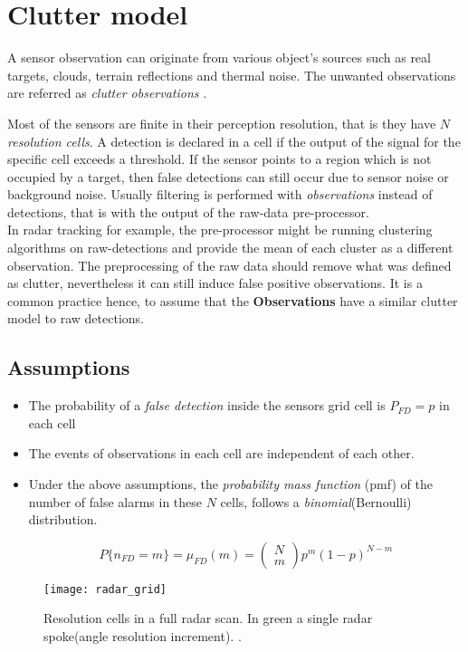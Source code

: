 \section{Clutter model}
A sensor observation can originate from various object's sources such as real targets, clouds, terrain reflections and thermal noise. The unwanted observations are referred as \emph{clutter observations} \cite{Memon2020}.


Most of the sensors are finite in their perception resolution, that is they have $N$  \emph{resolution cells}. A detection is declared in a cell if  the output of the signal for the specific cell exceeds a threshold. If the sensor points to a region which is not occupied by a target, then false detections can still occur  due to sensor noise or background noise. Usually filtering is performed with \emph{observations} instead of detections, that is with the output of the raw-data pre-processor.\\

In radar tracking for example, the pre-processor might be running clustering algorithms on raw-detections and provide the mean of each cluster as a different observation. The preprocessing of the raw data should remove what was defined as clutter, nevertheless it can still induce false positive observations. It is a common practice hence, to assume that the \textbf{Observations} have a similar clutter model to raw detections.

\subsection{Assumptions}

\begin{itemize}
	\item The probability of a \emph{false detection} inside the sensors grid cell is $P_{FD} = p$ in each cell
	\item The events of observations in each cell are independent of each other.
	\item 
	Under the above assumptions, the \emph{probability mass function} (pmf) of the number of false alarms in these $N$ cells, follows a \emph{binomial}(Bernoulli) distribution.
	
	$$
	P\{n_{FD}=m\} = \mu_{FD}(m) = \begin{pmatrix}N \\m \end{pmatrix} p^m (1-p)^{N-m}
	$$
\end{itemize}
\begin{figure}[H]
	\centering
	\texttt{[image: radar\_grid]}
	\caption{Resolution cells in a full radar scan. In green a single radar spoke(angle resolution increment). \cite{Wilthil2017}.}
	\label{fig:radargrid}
\end{figure}

